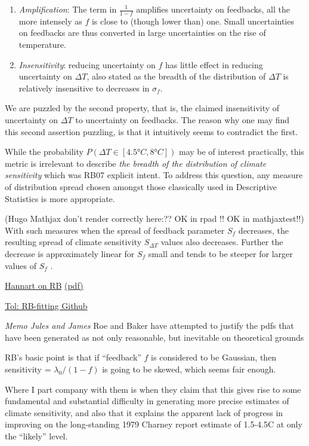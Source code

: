 \documentclass[
]{book}
\begin{document}
\begin{enumerate}
\def\labelenumi{\arabic{enumi}.}
\item
  \emph{Amplification}: The term in \(\frac{1}{1-f}\)
  amplifies uncertainty on feedbacks, all the more intensely as
  \(f\) is close to (though lower than) one. Small uncertainties on
  feedbacks are thus converted in large uncertainties on the
  rise of temperature.
\item
  \emph{Insensitivity}: reducing uncertainty on \(f\) has
  little effect in reducing uncertainty on \(\Delta T\),
  also stated as the breadth of the distribution of \(\Delta T\)
  is relatively insensitive to decreases in \(\sigma_f\).
\end{enumerate}

We are puzzled by the second property, that is,
the claimed insensitivity of uncertainty on \(\Delta T\) to uncertainty on feedbacks.
The reason why one may find this second assertion puzzling,
is that it intuitively seems to contradict the first.

While the probability \(P(\Delta T \in [4.5°C, 8°C])\) may be of interest practically,
this metric is irrelevant to describe \emph{the breadth of the
distribution of climate sensitivity} which was RB07 explicit intent.
To address this question, any measure of distribution
spread chosen amongst those classically used in Descriptive
Statistics is more appropriate.

(Hugo Mathjax don't render correctly here:?? OK in rpad !! OK in mathjaxtest!!)
With such measures when the spread of feedback parameter \(S_f\) decreases,
the resulting spread of climate sensitivity \(S_{\Delta T}\) values also decreases.
Further the decrease is approximately linear for
\(S_f\) small and tends to be steeper for larger values of \(S_{f}\) .

\href{https://agupubs.onlinelibrary.wiley.com/doi/full/10.1029/2009GL039640}{Hannart on RB}
\href{pdf/Hannart_2009_ECS_not_so_Unpredictable.pdf}{(pdf)}

\href{https://github.com/rtol/roebaker}{Tol: RB-fitting Github}

\emph{Memo Jules and James}
Roe and Baker have attempted to justify the pdfs that have been generated
as not only reasonable, but inevitable on theoretical grounds

RB's basic point is that if ``feedback'' \(f\) is considered to be Gaussian, then
sensitivity = \(\lambda_0/(1-f)\) is going to be skewed, which seems fair enough.

Where I part company with them is when they claim that this gives rise to some
fundamental and substantial difficulty in generating more precise estimates
of climate sensitivity, and also that it explains
the apparent lack of progress in improving on the long-standing
1979 Charney report estimate of 1.5-4.5C at only the ``likely'' level.
\end{document}

